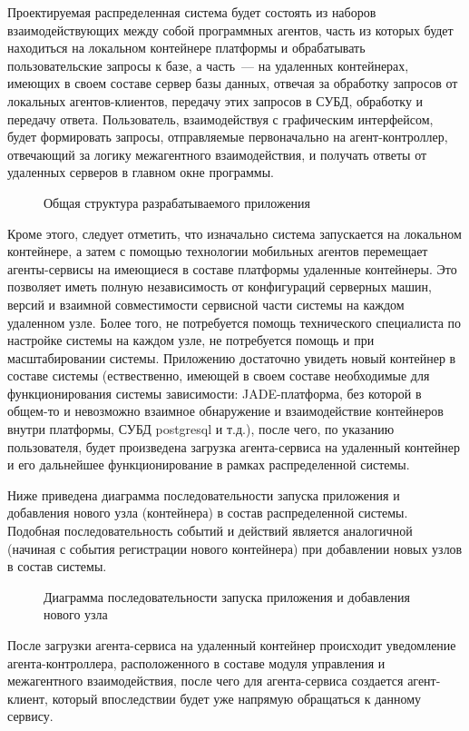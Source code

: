	Проектируемая распределенная система будет состоять из наборов взаимодействующих между собой программных агентов, часть из которых будет находиться на локальном контейнере платформы и обрабатывать пользовательские  запросы к базе, а часть~--- на удаленных контейнерах, имеющих в своем составе сервер базы данных, отвечая за обработку запросов от локальных агентов-клиентов, передачу этих запросов в СУБД, обработку и передачу ответа. Пользователь, взаимодействуя с графическим интерфейсом, будет формировать запросы, отправляемые первоначально на агент-контроллер, отвечающий за логику  межагентного взаимодействия, и получать ответы от удаленных серверов в главном окне программы.
\begin{figure}[h]
\caption{Общая структура разрабатываемого приложения}
\label{3:common-scheme}
\end{figure}
Кроме этого, следует отметить, что изначально система запускается на локальном контейнере, а затем с помощью технологии мобильных агентов перемещает агенты-сервисы на имеющиеся в составе платформы удаленные контейнеры. Это позволяет иметь полную независимость от конфигураций серверных машин, версий и взаимной совместимости сервисной части системы на каждом удаленном узле. Более того, не потребуется помощь технического специалиста по настройке системы на каждом узле, не потребуется помощь и при масштабировании системы. Приложению достаточно увидеть новый контейнер в составе системы (ествественно, имеющей в своем составе необходимые для функционирования системы зависимости: JADE-платформа, без которой в общем-то и невозможно взаимное обнаружение и взаимодействие контейнеров внутри платформы, СУБД postgresql и т.д.), после чего, по указанию пользователя, будет произведена загрузка агента-сервиса на удаленный контейнер и его дальнейшее функционирование в рамках распределенной системы.

	Ниже приведена диаграмма последовательности запуска приложения и добавления нового узла (контейнера) в состав распределенной системы. Подобная последовательность событий и действий является аналогичной (начиная с события регистрации нового контейнера) при добавлении новых узлов в состав системы.
\begin{figure}[h]
\caption{Диаграмма последовательности запуска приложения и добавления нового узла}
\label{3:seq-launch}
\end{figure}
После загрузки агента-сервиса на удаленный контейнер происходит уведомление агента-контроллера, расположенного в составе модуля управления и  межагентного взаимодействия, после чего для агента-сервиса создается агент-клиент, который впоследствии будет уже напрямую обращаться к данному сервису.

